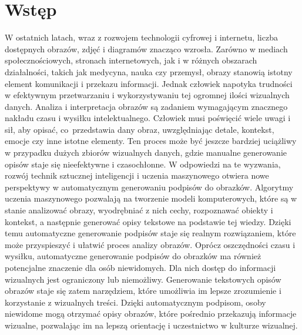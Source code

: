 \newpage %
\section{Wstęp}
W ostatnich latach, wraz z rozwojem technologii cyfrowej i internetu, liczba dostępnych obrazów, zdjęć i diagramów znacząco wzrosła. Zarówno w mediach społecznościowych, stronach internetowych, jak i w różnych obszarach działalności, takich jak medycyna, nauka czy przemysł, obrazy stanowią istotny element komunikacji i przekazu informacji. Jednak człowiek napotyka trudności w efektywnym przetwarzaniu i wykorzystywaniu tej ogromnej ilości wizualnych danych. Analiza i interpretacja obrazów są zadaniem wymagającym znacznego nakładu czasu i wysiłku intelektualnego. Człowiek musi poświęcić wiele uwagi i sił, aby opisać, co~przedstawia dany obraz, uwzględniając detale, kontekst, emocje czy inne istotne elementy. Ten proces może być jeszcze bardziej uciążliwy w przypadku dużych zbiorów wizualnych danych, gdzie manualne generowanie opisów staje się nieefektywne i czasochłonne. W odpowiedzi na te wyzwania, rozwój technik sztucznej inteligencji i uczenia maszynowego otwiera nowe perspektywy w automatycznym generowaniu podpisów do obrazków. Algorytmy uczenia maszynowego pozwalają na tworzenie modeli komputerowych, które są w stanie analizować obrazy, wyodrębniać z nich cechy, rozpoznawać obiekty i kontekst, a następnie generować opisy tekstowe na podstawie tej wiedzy. Dzięki temu automatyczne generowanie podpisów staje się realnym rozwiązaniem, które może przyspieszyć i ułatwić proces analizy obrazów. Oprócz oszczędności czasu i wysiłku, automatyczne generowanie podpisów do obrazków ma również potencjalne znaczenie dla osób niewidomych. Dla nich dostęp do informacji wizualnych jest ograniczony lub niemożliwy. Generowanie tekstowych opisów obrazów staje się zatem narzędziem, które umożliwia im lepsze zrozumienie i korzystanie z wizualnych treści. Dzięki automatycznym podpisom, osoby niewidome mogą otrzymać opisy obrazów, które pośrednio przekazują informacje wizualne, pozwalając im na lepszą orientację i uczestnictwo w kulturze wizualnej.
